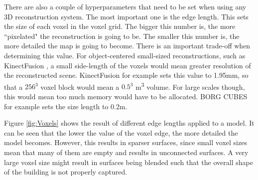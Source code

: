 \documentclass[11pt]{article}
\begin{document}
There are also a couple of hyperparameters that need to be set when using any 3D reconstruction system. The most important one is the edge length. This sets the size of each voxel in the voxel grid. The bigger this number is, the more ``pixelated" the reconstruction is going to be. The smaller this number is, the more detailed the map is going to become. There is an important trade-off when determining this value. For object-centered small-sized reconstructions, such as KinectFusion \cite{kinectfusion}, a small side-length of the voxels would mean greater resolution of the reconstructed scene. KinectFusion for example sets this value to	 1.95mm, so that a $256^3$ voxel block would mean a $0.5^3$ m\textsuperscript{3} volume. For large scales though, this would mean too much memory would have to be allocated. BORG CUBES for example sets the size length to 0.2m.
	
Figure \ref{fig:Voxels} shows the result of different edge lengths applied to a model. It can be seen that the lower the value of the voxel edge, the more detailed the model becomes. However, this results in sparser surfaces, since small voxel sizes mean that many of them are empty and results in unconnected surfaces. A very large voxel size might result in surfaces being blended such that the overall shape of the building is not properly captured.
\end{document}
